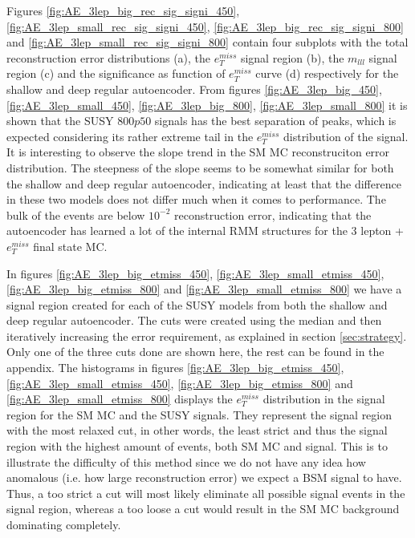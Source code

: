 Figures \ref{fig:AE_3lep_big_rec_sig_signi_450}, \ref{fig:AE_3lep_small_rec_sig_signi_450}, 
\ref{fig:AE_3lep_big_rec_sig_signi_800} and \ref{fig:AE_3lep_small_rec_sig_signi_800} contain four 
subplots with the total reconstruction error distributions (a), the $e_T^{miss}$ signal region (b), 
the $m_{lll}$ signal region (c) and the significance as function of $e_T^{miss}$ curve (d) respectively 
for the shallow and deep regular autoencoder. From figures \ref{fig:AE_3lep_big_450}, 
\ref{fig:AE_3lep_small_450}, \ref{fig:AE_3lep_big_800}, \ref{fig:AE_3lep_small_800} it is shown that the 
SUSY $800p50$ signals has the best separation of peaks, which is expected considering its 
rather extreme tail in the $e_T^{miss}$ distribution of the signal. It is interesting to 
observe the slope trend in the SM MC reconstruciton error distribution. The steepness of the 
slope seems to be somewhat similar for both the shallow and deep regular autoencoder, indicating 
at least that the difference in these two models does not differ much when it comes to performance. 
The bulk of the events are below $10^{-2}$ reconstruction error, indicating that the autoencoder 
has learned a lot of the internal RMM structures for the 3 lepton + $e_T^{miss}$ final state MC. \par
In figures \ref{fig:AE_3lep_big_etmiss_450}, \ref{fig:AE_3lep_small_etmiss_450}, 
\ref{fig:AE_3lep_big_etmiss_800} and  \ref{fig:AE_3lep_small_etmiss_800} we have a signal region 
created for each of the SUSY models from both the shallow and deep regular autoencoder. The cuts 
were created using the median and then iteratively increasing the error requirement, as 
explained in section \ref{sec:strategy}. Only one of the three cuts done are shown here, the 
rest can be found in the appendix. The histograms in figures \ref{fig:AE_3lep_big_etmiss_450}, 
\ref{fig:AE_3lep_small_etmiss_450}, \ref{fig:AE_3lep_big_etmiss_800} and  
\ref{fig:AE_3lep_small_etmiss_800} displays the $e_T^{miss}$ distribution in the signal region 
for the SM MC and the SUSY signals. They represent the signal region with the most relaxed cut, 
in other words, the least strict and thus the signal region with the highest amount of events, 
both SM MC and signal. This is to illustrate the difficulty of this method since we do not have 
any idea how anomalous (i.e. how large reconstruction error) we expect a BSM signal to have. 
Thus, a too strict a cut will most likely eliminate all possible 
signal events in the signal region, whereas a too loose a cut would result in the SM MC background dominating completely. \par
